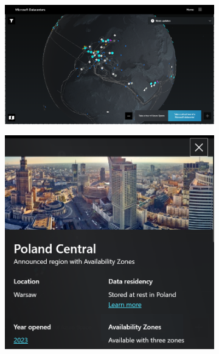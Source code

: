\vfill
\pagebreak

\begin{figure}[H]
    \begin{subfigure}[m]{0.7\textwidth}
    \includegraphics[width=\textwidth]{images/azure-ic}
    \end{subfigure}
    \hfill
    \begin{subfigure}[m]{0.25\textwidth}
        \includegraphics[width=\textwidth]{images/azure-pl}
    \end{subfigure}
    \label{fig:azure-ic}
\end{figure}

